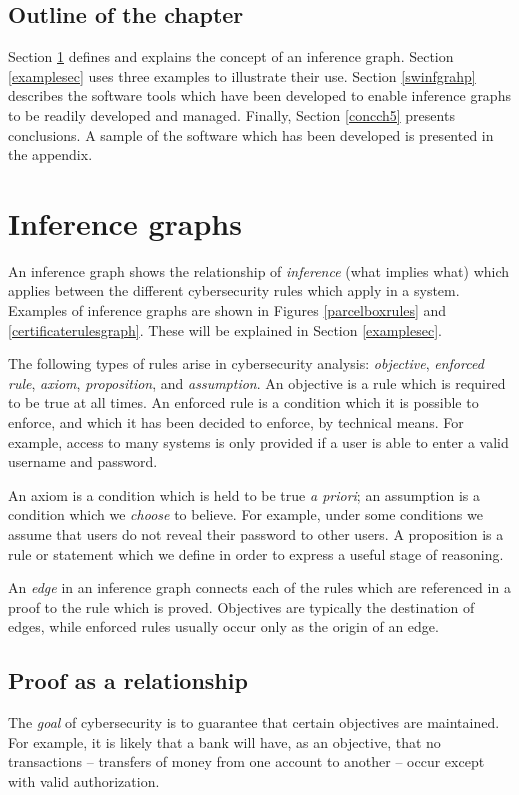 \subsection{Outline of the chapter}
Section \ref{inferencesec} defines and explains the concept of an inference graph.
Section \ref{examplesec} uses three examples to illustrate their use. Section \ref{swinfgrahp}
describes the software tools which have been developed to enable inference
graphs to be readily developed and managed. Finally, Section \ref{concch5}
presents conclusions. A sample of the software which has been developed is presented in the appendix.

 
\section{Inference graphs}\label{inferencesec}
An inference graph shows the relationship of {\em inference} (what implies what)
which applies between the different cybersecurity rules which apply in a system.
Examples of inference graphs are shown in Figures \ref{parcelboxrules} 
and \ref{certificaterulesgraph}. These will be explained in Section \ref{examplesec}.

The following types of rules arise in cybersecurity analysis:
{\em objective}, {\em enforced rule}, {\em axiom}, {\em proposition}, and {\em assumption}.
An objective is a rule which is required to be true at all times.
An enforced rule is a condition which it is possible to enforce,
and which it has been decided to enforce, by technical means.
For example, access to many systems is only provided if a user is able
to enter a valid username and password.

An axiom is a condition which is held to be true {\em a priori};
an assumption is a condition which we {\em choose} to believe.
For example, under some conditions we assume that users do not reveal their
password to other users.
A proposition is a rule or statement which we define in order
to express a useful stage of reasoning.

An {\em edge} in an inference graph connects each of the rules which
 are referenced in a proof to the rule which is proved. Objectives
are typically the destination of edges, while enforced rules 
usually occur only as the origin of an edge.


\subsection{Proof as a relationship}
The {\em goal} of cybersecurity is to guarantee that certain objectives
are maintained. For example, it is likely that a bank will have, as an
objective, that no transactions -- transfers of money from
one account to another -- occur except with valid authorization.

